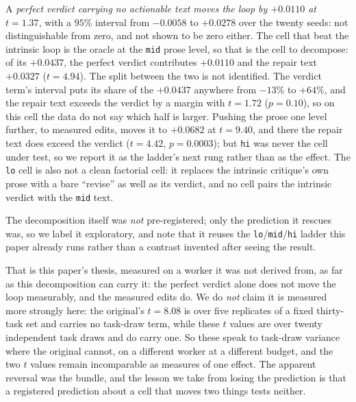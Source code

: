 \documentclass[11pt]{article}
\begin{document}
\noindent
A \emph{perfect verdict carrying no actionable text moves the loop by $+0.0110$ at $t = 1.37$},
with a $95\%$ interval from $-0.0058$ to $+0.0278$ over the twenty seeds: not distinguishable from
zero, and not shown to be zero either. The cell that beat the intrinsic loop is the oracle at the
\texttt{mid} prose level, so that is the cell to decompose: of its $+0.0437$, the perfect verdict
contributes $+0.0110$ and the repair text $+0.0327$ ($t = 4.94$). The split between the two is not
identified. The verdict term's interval puts its share of the $+0.0437$ anywhere from $-13\%$ to
$+64\%$, and the repair text exceeds the verdict by a margin with $t = 1.72$ ($p = 0.10$), so on
this cell the data do not say which half is larger. Pushing the prose one level further, to
measured edits, moves it to $+0.0682$ at $t = 9.40$, and there the repair text does exceed the
verdict ($t = 4.42$, $p = 0.0003$); but \texttt{hi} was never the cell under test, so we report it as
the ladder's next rung rather than as the effect. The \texttt{lo} cell is also not a clean
factorial cell: it replaces the intrinsic critique's own prose with a bare ``revise'' as well as
its verdict, and no cell pairs the intrinsic verdict with the \texttt{mid} text.

The decomposition itself was \emph{not} pre-registered; only the prediction it rescues was,
so we label it exploratory, and note that it reuses the \texttt{lo}/\texttt{mid}/\texttt{hi}
ladder this paper already runs rather than a contrast invented after seeing the result.

That is this paper's thesis, measured on a worker it was not derived from, as far as this
decomposition can carry it: the perfect verdict alone does not move the loop measurably, and the
measured edits do. We do \emph{not} claim it is measured more strongly here: the original's
$t = 8.08$ is over five replicates of a fixed thirty-task set and carries no task-draw term, while
these $t$ values are over twenty independent task draws and do carry one. So these speak to
task-draw variance where the original cannot, on a different worker at a different budget, and the
two $t$ values remain incomparable as measures of one effect. The apparent reversal was the bundle,
and the lesson we take from losing the prediction is that a registered prediction about a cell that
moves two things tests neither.
\end{document}
